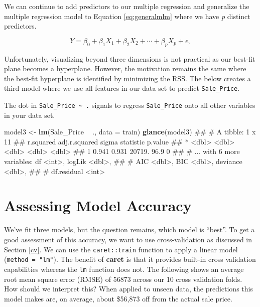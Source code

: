 \documentclass[]{book}
\newenvironment{Shaded}{\begin{snugshade}}{\end{snugshade}}
\newcommand{\DataTypeTok}[1]{\textcolor[rgb]{0.13,0.29,0.53}{#1}}
\newcommand{\KeywordTok}[1]{\textcolor[rgb]{0.13,0.29,0.53}{\textbf{#1}}}
\newcommand{\NormalTok}[1]{#1}
\newcommand{\OperatorTok}[1]{\textcolor[rgb]{0.81,0.36,0.00}{\textbf{#1}}}
\newcommand{\StringTok}[1]{\textcolor[rgb]{0.31,0.60,0.02}{#1}}
\theoremstyle{definition}
\theoremstyle{definition}
\theoremstyle{definition}
\theoremstyle{remark}
\begin{document}
We can continue to add predictors to our multiple regression and
generalize the multiple regression model to Equation \eqref{eq:generalmlm}
where we have \emph{p} distinct predictors.

\begin{equation}
\label{eq:generalmlm}
  Y = \beta_0 + \beta_1 X_1 + \beta_2 X_2 + \cdots + \beta_p X_p + \epsilon,
\end{equation}

Unfortunately, visualizing beyond three dimensions is not practical as
our best-fit plane becomes a hyperplane. However, the motivation remains
the same where the best-fit hyperplane is identified by minimizing the
RSS. The below creates a third model where we use all features in our
data set to predict \texttt{Sale\_Price}.

\begin{tip}
The dot in \texttt{Sale\_Price\ \textasciitilde{}\ .} signals to regress
\texttt{Sale\_Price} onto all other variables in your data set.
\end{tip}

\begin{Shaded}
\begin{Highlighting}[]
\NormalTok{model3 <-}\StringTok{ }\KeywordTok{lm}\NormalTok{(Sale_Price }\OperatorTok{~}\StringTok{ }\NormalTok{., }\DataTypeTok{data =}\NormalTok{ train)}
\KeywordTok{glance}\NormalTok{(model3)}
\NormalTok{## # A tibble: 1 x 11}
\NormalTok{##   r.squared adj.r.squared  sigma statistic p.value}
\NormalTok{## *     <dbl>         <dbl>  <dbl>     <dbl>   <dbl>}
\NormalTok{## 1     0.941         0.931 20719.      96.9       0}
\NormalTok{## # ... with 6 more variables: df <int>, logLik <dbl>,}
\NormalTok{## #   AIC <dbl>, BIC <dbl>, deviance <dbl>,}
\NormalTok{## #   df.residual <int>}
\end{Highlighting}
\end{Shaded}

\hypertarget{assessing-model-accuracy}{%
\section{Assessing Model Accuracy}\label{assessing-model-accuracy}}

We've fit three models, but the question remains, which model is
``best''. To get a good assessment of this accuracy, we want to use
cross-validation as discussed in Section \ref{cv}. We can use the
\texttt{caret::train} function to apply a linear model
(\texttt{method\ =\ "lm"}). The benefit of \textbf{caret} is that it
provides built-in cross validation capabilities whereas the \texttt{lm}
function does not. The following shows an average root mean square error
(RMSE) of 56873 across our 10 cross validation folds. How should we
interpret this? When applied to unseen data, the predictions this model
makes are, on average, about \$56,873 off from the actual sale price.
\end{document}
